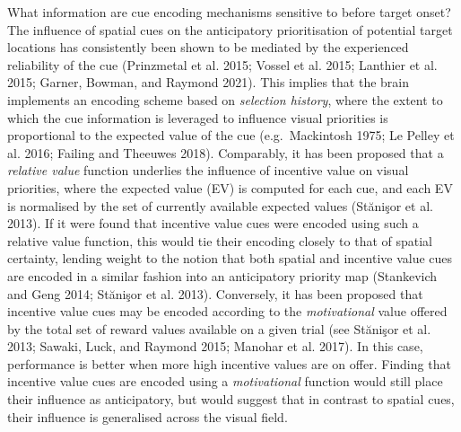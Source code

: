 \documentclass[11pt,halfline,a4paper,]{ouparticle}
\begin{document}
What information are cue encoding mechanisms sensitive to before target onset? The influence of spatial cues on the anticipatory prioritisation of potential target locations has consistently been shown to be mediated by the experienced reliability of the cue (Prinzmetal et al. 2015; Vossel et al. 2015; Lanthier et al. 2015; Garner, Bowman, and Raymond 2021). This implies that the brain implements an encoding scheme based on \emph{selection history}, where the extent to which the cue information is leveraged to influence visual priorities is proportional to the expected value of the cue (e.g.~Mackintosh 1975; Le Pelley et al. 2016; Failing and Theeuwes 2018). Comparably, it has been proposed that a \emph{relative value} function underlies the influence of incentive value on visual priorities, where the expected value (EV) is computed for each cue, and each EV is normalised by the set of currently available expected values (Stănişor et al. 2013). If it were found that incentive value cues were encoded using such a relative value function, this would tie their encoding closely to that of spatial certainty, lending weight to the notion that both spatial and incentive value cues are encoded in a similar fashion into an anticipatory priority map (Stankevich and Geng 2014; Stănişor et al. 2013). Conversely, it has been proposed that incentive value cues may be encoded according to the \emph{motivational} value offered by the total set of reward values available on a given trial (see Stănişor et al. 2013; Sawaki, Luck, and Raymond 2015; Manohar et al. 2017). In this case, performance is better when more high incentive values are on offer. Finding that incentive value cues are encoded using a \emph{motivational} function would still place their influence as anticipatory, but would suggest that in contrast to spatial cues, their influence is generalised across the visual field.
\end{document}
